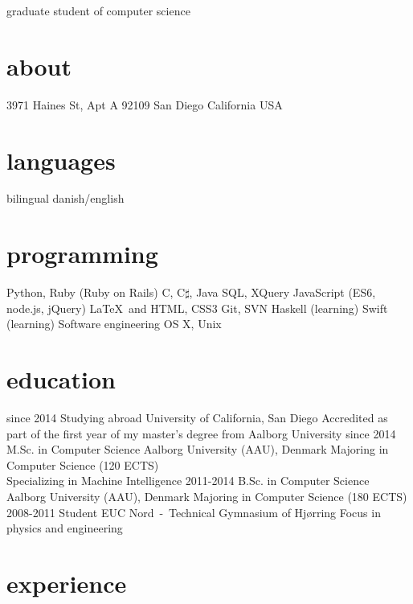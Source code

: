 \documentclass{afriggeri-cv/friggeri-cv}
\newcommand{\aau}{%
  Aalborg University (AAU), Denmark
}
\begin{document}
       {graduate student of computer science}

\begin{aside}
  \section{about}
    3971 Haines St, Apt A
    92109 San Diego
    California
    USA
    ~
  \section{languages}
    bilingual danish/english
  \section{programming}
    Python, Ruby
    (Ruby on Rails)
    C, C$\sharp$, Java
    SQL, XQuery
    JavaScript
    (ES6, node.js, jQuery)
    \LaTeX\ and \XeTeX
    HTML, CSS3
    Git, SVN
    Haskell (learning)
    Swift (learning)
    Software engineering
    OS X, Unix
\end{aside}

\section{education}

\begin{entrylist}
  \entry
    {since 2014}
    {Studying abroad}
    {University of California, San Diego}
    {Accredited as part of the first year of my master's degree from Aalborg University}
  \entry
    {since 2014}
    {M.Sc. {\normalfont in Computer Science}}
    {\aau}
    {Majoring in Computer Science (120 ECTS)\\
    Specializing in Machine Intelligence}
  \entry
    {2011-2014}
    {B.Sc. {\normalfont in Computer Science}}
    {\aau}
    {Majoring in Computer Science (180 ECTS)}
  \entry
    {2008-2011}
    {Student}
    {EUC Nord~-~Technical Gymnasium of Hjørring}
    {Focus in physics and engineering}
\end{entrylist}

\section{experience}
\end{document}
